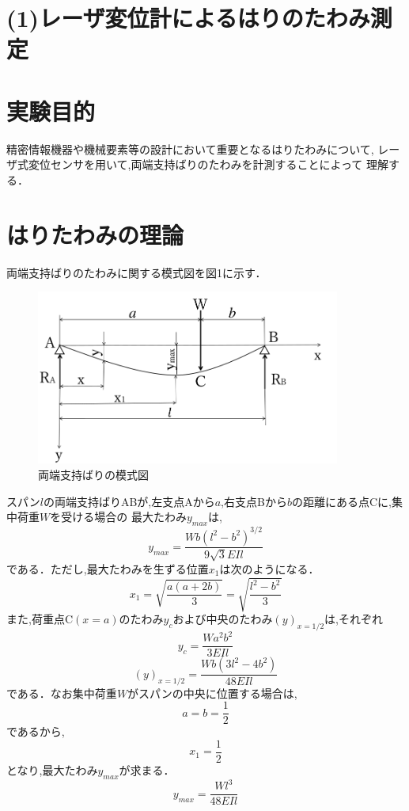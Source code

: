 \documentclass[a4paper,11pt]{jsarticle}
\begin{document}
\section*{(1)レーザ変位計によるはりのたわみ測定}

\section{実験目的}
精密情報機器や機械要素等の設計において重要となるはりたわみについて,
レーザ式変位センサを用いて,両端支持ばりのたわみを計測することによって
理解する．

\section{はりたわみの理論}
両端支持ばりのたわみに関する模式図を図1に示す．

\begin{figure}[h]
  \centering
  \includegraphics[width=10cm]{AB.png}
  \caption{両端支持ばりの模式図}
\end{figure}
スパン$l$の両端支持ばりABが,左支点Aから$a$,右支点Bから$b$の距離にある点Cに,集中荷重$W$を受ける場合の
最大たわみ$y_{max}$は,
\begin{equation}
  y_{max} = {\dfrac{Wb({l^2}-{b^2})^{3/2}}{9\sqrt{3}EIl}}
\end{equation}
である．ただし,最大たわみを生ずる位置$x_1$は次のようになる．
\begin{equation}
  x_1 = {\sqrt{\dfrac{a(a+2b)}{3}}}={\sqrt{\dfrac{{l^2}-{b^2}}{3}}}
\end{equation}
また,荷重点C$(x=a)$のたわみ$y_c$および中央のたわみ$(y)_{x={1/2}}$は,それぞれ
\begin{equation}
  y_{c} = {\dfrac{Wa^{2}b^{2}}{3EIl}}
\end{equation}
\begin{equation}
  (y)_{x={1/2}} = {\dfrac{Wb(3l^{2}-4b^{2})}{48EIl}}
\end{equation}
である．なお集中荷重$W$がスパンの中央に位置する場合は,
\begin{equation}
  a = b = \dfrac{1}{2}
\end{equation}
であるから,
\begin{equation}
  x_1 = \dfrac{1}{2}
\end{equation}
となり,最大たわみ$y_{max}$が求まる．
\begin{equation}
  y_{max} = {\dfrac{Wl^{3}}{48EIl}}
\end{equation}
\end{document}
